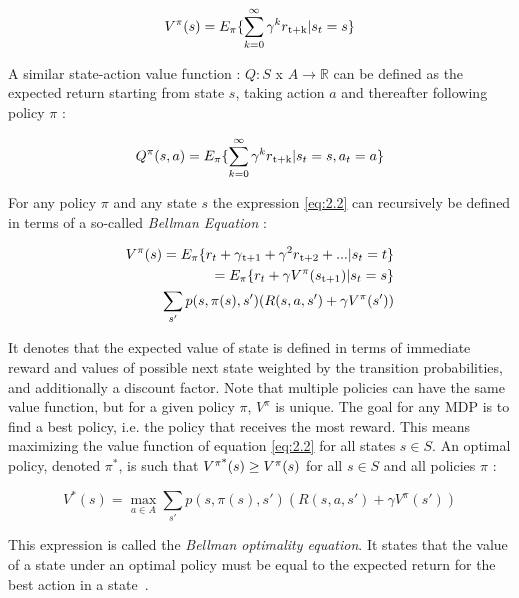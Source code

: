 \begin{equation}
	V^\pi (s) = E_\pi \{\sum_{k = 0}^{\infty} \gamma^k r\textsubscript{t+k} | s_t = s\}
\end{equation}

A similar state-action value function : $Q : S$ x $A \rightarrow \mathbb{R}$ can be defined as the expected return starting from state $s$, taking action $a$ and thereafter following policy $\pi$ :

\begin{equation} \label{eq:2.2}
	Q^\pi (s,a) = E_\pi\{\sum_{k = 0}^{\infty} \gamma^k r\textsubscript{t+k} | s_t = s, a_t = a\}
\end{equation}

For any policy $\pi$ and any state $s$ the expression \ref{eq:2.2} can recursively be defined in terms of a so-called \textit{Bellman Equation} :

\begin{equation}
\begin{split}
	V^\pi (s) = E_\pi\{r_t + \gamma\textsubscript{t+1} + \gamma^2 r\textsubscript{t+2} + ... | s_t = t\} \\
	= E_\pi \{r_t + \gamma V^\pi(s\textsubscript{t+1}) | s_t = s\} \\
	\sum_{s'}p(s, \pi(s), s') (R(s, a, s') + \gamma V^\pi (s'))
\end{split}	
\end{equation}

It denotes that the expected value of state is defined in terms of immediate reward and values of possible next state weighted by the transition probabilities, and additionally a discount factor. Note that multiple policies can have the same value function, but for a given policy $\pi$, $V^\pi$ is unique. The goal for any MDP is to find a best policy, i.e. the policy that receives the most reward. This means maximizing the value function of equation \ref{eq:2.2} for all states $s \in S$. An optimal policy, denoted $\pi^*$, is such that $V\textsuperscript{$\pi$*} (s) \geq V^\pi (s)$ for all $s \in S$ and all policies $\pi$ :

\begin{equation} 
\label{eq:2.5}
V^*(s) = \max_{a \in A} \sum_{s'}p(s, \pi(s), s') (R(s, a, s') + \gamma V^\pi (s'))
\end{equation}

This expression is called the \textit{Bellman optimality equation}. It states that the value of a state under an optimal policy must be equal to the expected return for the best action in a state~\cite{wiering2012reinforcement}.

